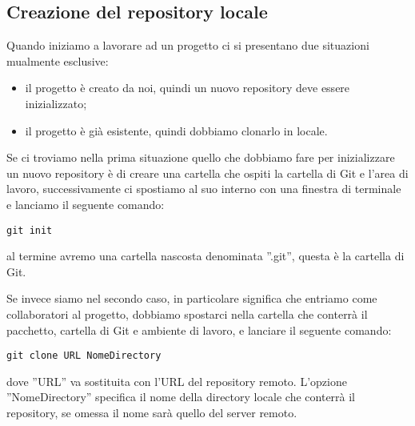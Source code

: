 \subsection{Creazione del repository locale}
Quando iniziamo a lavorare ad un progetto ci si presentano due situazioni mualmente esclusive:

\begin{itemize}
\item il progetto è creato da noi, quindi un nuovo repository deve essere inizializzato;
\item il progetto è già esistente, quindi dobbiamo clonarlo in locale.
\end{itemize}

Se ci troviamo nella prima situazione quello che dobbiamo fare per inizializzare un nuovo repository è di creare una cartella che ospiti la cartella di Git e l'area di lavoro, successivamente ci spostiamo al suo interno con una finestra di terminale e lanciamo il seguente comando:

\begin{center}
\texttt{git init}
\end{center}

al termine avremo una cartella nascosta denominata ''.git'', questa è la cartella di Git.

Se invece siamo nel secondo caso, in particolare significa che entriamo come collaboratori al progetto, dobbiamo spostarci nella cartella che conterrà il pacchetto, cartella di Git e ambiente di lavoro, e lanciare il seguente comando:

\begin{center}
\texttt{git clone URL NomeDirectory}
\end{center}

dove ''URL'' va sostituita con l'URL del repository remoto. L'opzione ''NomeDirectory'' specifica il nome della directory locale che conterrà il repository, se omessa il nome sarà quello del server remoto.
